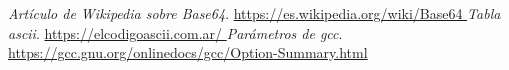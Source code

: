 \documentclass[titlepage,a4paper]{article}
\begin{document}
\newpage
\begin{thebibliography}{9}

\textit{Artículo de Wikipedia sobre Base64}. 
\href {https://es.wikipedia.org/wiki/Base64}{
https://es.wikipedia.org/wiki/Base64
}
\textit{Tabla ascii}. 
\href {https://elcodigoascii.com.ar/}{
https://elcodigoascii.com.ar/
}
\textit{Parámetros de gcc}. 
\href {https://gcc.gnu.org/onlinedocs/gcc/Option-Summary.html}{
https://gcc.gnu.org/onlinedocs/gcc/Option-Summary.html
}
\end{thebibliography}
\end{document}
